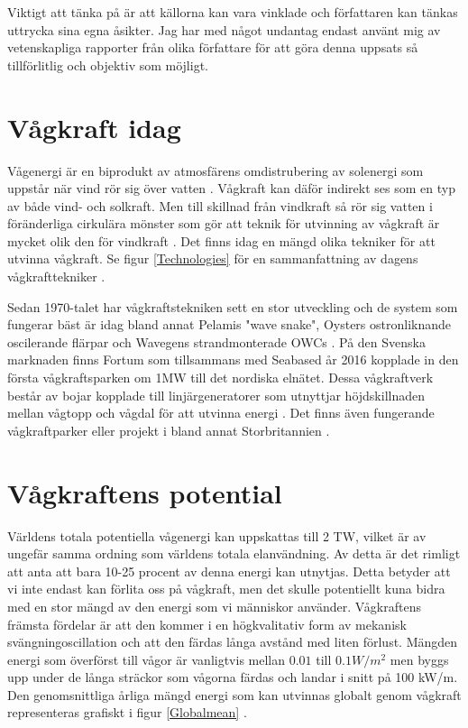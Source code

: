 \documentclass[10pt,a4paper,oneside]{article}
\begin{document}
Viktigt att tänka på är att källorna kan vara vinklade och författaren kan tänkas uttrycka sina egna åsikter. Jag har med något undantag endast använt mig av vetenskapliga rapporter från olika författare för att göra denna uppsats så tillförlitlig och objektiv som möjligt.\newpage

\section{Vågkraft idag}
Vågenergi är en biprodukt av atmosfärens omdistrubering av solenergi som uppstår när vind rör sig över vatten \cite{Cruz}. Vågkraft kan däför indirekt ses som en typ av både vind- och solkraft. Men till skillnad från vindkraft så rör sig vatten i föränderliga cirkulära mönster som gör att teknik för utvinning av vågkraft är mycket olik den för vindkraft \cite{Elliott}. Det finns idag en mängd olika tekniker för att utvinna vågkraft. Se figur \ref{Technologies} för en sammanfattning av dagens vågkrafttekniker \cite{IRENA}.

Sedan 1970-talet har vågkraftstekniken sett en stor utveckling och de system som fungerar bäst är idag bland annat Pelamis "wave snake", Oysters ostronliknande oscilerande flärpar och Wavegens strandmonterade  OWCs \cite{Elliott}. På den Svenska marknaden finns Fortum som tillsammans med Seabased år 2016 kopplade in den första vågkraftsparken om 1MW till det nordiska elnätet. Dessa vågkraftverk består av bojar kopplade till linjärgeneratorer som utnyttjar höjdskillnaden mellan vågtopp och vågdal för att utvinna energi \cite{Fortum}. Det finns även fungerande vågkraftparker eller projekt i bland annat Storbritannien \cite{Yale}.  


\section{Vågkraftens potential}
Världens totala potentiella vågenergi kan uppskattas till 2 TW, vilket är av ungefär samma ordning som världens totala elanvändning. Av detta är det rimligt att anta att bara 10-25 procent av denna energi kan utnytjas. Detta betyder att vi inte endast kan förlita oss på vågkraft, men det skulle potentiellt kuna bidra med en stor mängd av den energi som vi människor använder. Vågkraftens främsta fördelar är att den kommer i en högkvalitativ form av mekanisk svängningoscillation och att den färdas långa avstånd med liten förlust. Mängden energi som överförst till vågor är vanligtvis mellan \begin{math} 0.01  \end{math} till \begin{math} 0.1 W/m^2 \end{math} men byggs upp under de långa sträckor som vågorna färdas och landar i snitt på 100 kW/m. Den genomsnittliga årliga mängd energi som kan utvinnas globalt genom vågkraft representeras grafiskt i figur \ref{Globalmean} \citep{Cruz}. 
\end{document}
